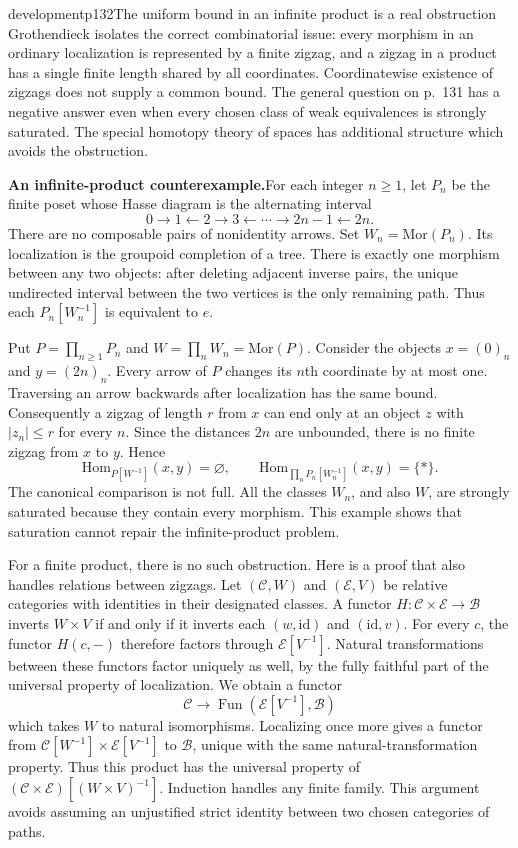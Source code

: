 \begin{dcomment}{development}{p132}{The uniform bound in an infinite product is a real obstruction}
Grothendieck isolates the correct combinatorial issue: every morphism in an ordinary localization is represented by a finite zigzag, and a zigzag in a product has a single finite length shared by all coordinates. Coordinatewise existence of zigzags does not supply a common bound. The general question on p.~131 has a negative answer even when every chosen class of weak equivalences is strongly saturated. The special homotopy theory of spaces has additional structure which avoids the obstruction.

\textbf{An infinite-product counterexample.}\ours\quad For each integer $n\geq1$, let $P_n$ be the finite poset whose Hasse diagram is the alternating interval
\[
 0\longrightarrow1\longleftarrow2\longrightarrow3
   \longleftarrow\cdots\longrightarrow2n-1\longleftarrow2n.
\]
There are no composable pairs of nonidentity arrows. Set $W_n=\mathrm{Mor}(P_n)$. Its localization is the groupoid completion of a tree. There is exactly one morphism between any two objects: after deleting adjacent inverse pairs, the unique undirected interval between the two vertices is the only remaining path. Thus each $P_n[W_n^{-1}]$ is equivalent to $e$.

Put $P=\prod_{n\geq1}P_n$ and $W=\prod_nW_n=\mathrm{Mor}(P)$. Consider the objects $x=(0)_n$ and $y=(2n)_n$. Every arrow of $P$ changes its $n$th coordinate by at most one. Traversing an arrow backwards after localization has the same bound. Consequently a zigzag of length $r$ from $x$ can end only at an object $z$ with $|z_n|\leq r$ for every $n$. Since the distances $2n$ are unbounded, there is no finite zigzag from $x$ to $y$. Hence
\[
 \mathrm{Hom}_{P[W^{-1}]}(x,y)=\varnothing,
 \qquad
 \mathrm{Hom}_{\prod_nP_n[W_n^{-1}]}(x,y)=\{*\}.
\]
The canonical comparison is not full. All the classes $W_n$, and also $W$, are strongly saturated because they contain every morphism. This example shows that saturation cannot repair the infinite-product problem.

For a finite product, there is no such obstruction. Here is a proof that also handles relations between zigzags. Let $(\mathcal C,W)$ and $(\mathcal E,V)$ be relative categories with identities in their designated classes. A functor $H:\mathcal C\times\mathcal E\to\mathcal B$ inverts $W\times V$ if and only if it inverts each $(w,\mathrm{id})$ and $(\mathrm{id},v)$. For every $c$, the functor $H(c,-)$ therefore factors through $\mathcal E[V^{-1}]$. Natural transformations between these functors factor uniquely as well, by the fully faithful part of the universal property of localization. We obtain a functor
\[
 \mathcal C\longrightarrow
 \operatorname{Fun}(\mathcal E[V^{-1}],\mathcal B)
\]
which takes $W$ to natural isomorphisms. Localizing once more gives a functor from $\mathcal C[W^{-1}]\times\mathcal E[V^{-1}]$ to $\mathcal B$, unique with the same natural-transformation property. Thus this product has the universal property of $(\mathcal C\times\mathcal E)[(W\times V)^{-1}]$. Induction handles any finite family. This argument avoids assuming an unjustified strict identity between two chosen categories of paths.


\end{dcomment}
